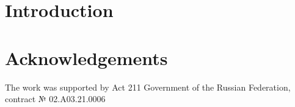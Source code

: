 \documentclass{../download/tPRS2e}
\begin{document}
\section{Introduction}

\section*{Acknowledgements}

The work was supported by Act 211 Government of the Russian Federation, contract № 02.A03.21.0006


\nocite{*}

\end{document}
